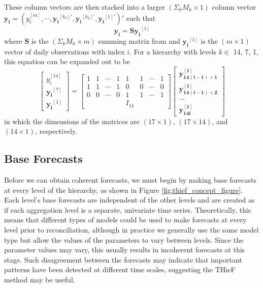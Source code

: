 \documentclass[thesis]{umassthesis}  %
\begin{document}
These column vectors are then stacked into a larger $(\Sigma_{k} M_k \times 1)$ column vector $\boldsymbol{y_i} = (y_i^{[m]}, \cdots, \boldsymbol{y_i}^{[k_3]'}, \boldsymbol{y_i}^{[k_2]'}, \boldsymbol{y_i}^{[1]'})'$ such that \[\boldsymbol{y_i} = \boldsymbol{S y_i}^{[1]}\] where $\boldsymbol{S}$ is the $(\Sigma_{k} M_k \times m)$ summing matrix from \cite{summing_matrix} and $\boldsymbol{y_i}^{[1]}$ is the $(m \times 1)$ vector of daily observations with index $i$. For a hierarchy with levels $k \in$ {14, 7, 1}, this equation can be expanded out to be
\[\begin{bmatrix} y_i^{[14]}\\ \boldsymbol{y_i}^{[7]}\\ \boldsymbol{y_i}^{[1]} \end{bmatrix} =
\begin{bmatrix}
1 & 1 & \cdots & 1 & 1 & 1 & \cdots & 1 \\
1 & 1 & \cdots & 1 & 0 & 0 & \cdots & 0 \\
0 & 0 & \cdots & 0 & 1 & 1 & \cdots & 1 \\
  &   &   &   & I_{14} &   &   &
\end{bmatrix}
\begin{bmatrix} \boldsymbol{y_{14(i-1)+1}^{[1]}}\\ \boldsymbol {y_{14(i-1)+2}^{[1]}}\\ \cdots\\ \boldsymbol{y_{14i}^{[1]}} \end{bmatrix}\] in which the dimensions of the matrices are $(17 \times 1)$, $(17 \times 14)$, and $(14 \times 1)$, respectively.

\subsection{Base Forecasts} \label{thief_base_forecasts}
Before we can obtain coherent forecasts, we must begin by making base forecasts at every level of the hierarchy, as shown in Figure \ref{fig:thief_concept_figure}. Each level's base forecasts are independent of the other levels and are created as if each aggregation level is a separate, univariate time series. Theoretically, this means that different types of models could be used to make forecasts at every level prior to reconciliation, although in practice we generally use the same model type but allow the values of the parameters to vary between levels. Since the parameter values may vary, this usually results in incoherent forecasts at this stage. Such disagreement between the forecasts may indicate that important patterns have been detected at different time scales, suggesting the THieF method may be useful.
\end{document}
